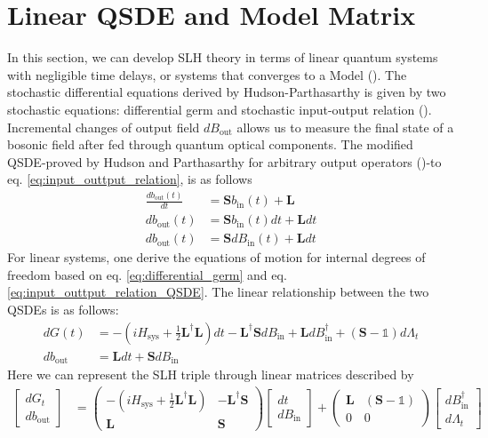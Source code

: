 \documentclass[a4paper]{article}
\theoremstyle{definition}
\begin{document}
\section*{Linear QSDE and Model Matrix}
In this section, we can develop SLH theory in terms of linear quantum systems with negligible time delays, or systems that converges to a Model (\citealp{Combes_2017,Hudson1984, Nurdin_2010}). The stochastic differential equations derived by Hudson-Parthasarthy is given by two stochastic equations: differential germ and stochastic input-output relation (\citealp{Gough_2008}).  
Incremental changes of output field $dB_{\text{out}}$ allows us to measure the final state of a bosonic field after fed through quantum optical components. The modified QSDE-proved by Hudson and Parthasarthy  for arbitrary output operators (\citealp{Hudson1984})-to eq. \ref{eq:input_outtput_relation},  is as follows
\begin{align}
    \frac{db_{\text{out}}(t)}{dt} & = \textbf{S} b_{\text{in}}(t) + \textbf{L} \nonumber \\
    db_{\text{out}}(t) & = \textbf{S} b_{\text{in}}(t) dt + \textbf{L} dt \nonumber \\ 
    db_{\text{out}}(t) & = \textbf{S} dB_{\text{in}}(t) + \textbf{L} dt \label{eq:input_outtput_relation_QSDE}
\end{align}
For linear systems, one derive the equations of motion for internal degrees of freedom based on eq. \ref{eq:differential_germ} and eq. \ref{eq:input_outtput_relation_QSDE}. The linear relationship between the two QSDEs is as follows:
\begin{align*}
     dG(t) & = -(iH_{\text{sys}} + \frac{1}{2}\textbf{L}^\dagger \textbf{L}) dt  - \textbf{L}^\dagger \textbf{S} dB_\text{in} + \textbf{L} dB^\dagger_\text{in} + (\textbf{S}-\mathbb{1})d\Lambda_t \\
    db_{\text{out}} & = \textbf{L} dt +  \textbf{S} dB_{\text{in}} 
\end{align*}
Here we can represent the SLH triple through linear matrices described by 
\begin{align}
   \begin{bmatrix}
dG_t \\
db_{\text{out}}
\end{bmatrix} & = 
\begin{pmatrix}
-(iH_{\text{sys}} + \frac{1}{2}\textbf{L}^\dagger \textbf{L}) & - \textbf{L}^\dagger \textbf{S} \\
\textbf{L} & \textbf{S}
\end{pmatrix} 
\begin{bmatrix}
dt \\
dB_\text{in} 
\end{bmatrix}+ 
\begin{pmatrix}
\textbf{L} & (\textbf{S}-\mathbb{1}) \\
0 & 0
\end{pmatrix} 
\begin{bmatrix}
dB^\dagger_\text{in} \\
d\Lambda_t
\end{bmatrix}
\label{eq:model_matrix_eq}
\end{align}
\end{document}
